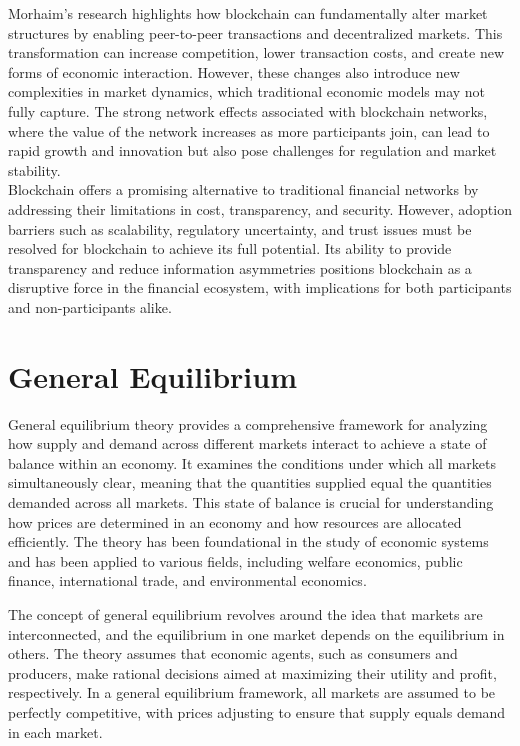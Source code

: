 Morhaim’s research highlights how blockchain can fundamentally alter market structures by enabling peer-to-peer transactions and decentralized markets. This transformation can increase competition, lower transaction costs, and create new forms of economic interaction. However, these changes also introduce new complexities in market dynamics, which traditional economic models may not fully capture. The strong network effects associated with blockchain networks, where the value of the network increases as more participants join, can lead to rapid growth and innovation but also pose challenges for regulation and market stability.
\cite{morhaim_blockchain_2019}\\

Blockchain offers a promising alternative to traditional financial networks by addressing their limitations in cost, transparency, and security. However, adoption barriers such as scalability, regulatory uncertainty, and trust issues must be resolved for blockchain to achieve its full potential. Its ability to provide transparency and reduce information asymmetries positions blockchain as a disruptive force in the financial ecosystem, with implications for both participants and non-participants alike.


\section{General Equilibrium}\label{cTGE}
General equilibrium theory provides a comprehensive framework for analyzing how supply and demand across different markets interact to achieve a state of balance within an economy. It examines the conditions under which all markets simultaneously clear, meaning that the quantities supplied equal the quantities demanded across all markets. This state of balance is crucial for understanding how prices are determined in an economy and how resources are allocated efficiently. The theory has been foundational in the study of economic systems and has been applied to various fields, including welfare economics, public finance, international trade, and environmental economics.

The concept of general equilibrium revolves around the idea that markets are interconnected, and the equilibrium in one market depends on the equilibrium in others. The theory assumes that economic agents, such as consumers and producers, make rational decisions aimed at maximizing their utility and profit, respectively. In a general equilibrium framework, all markets are assumed to be perfectly competitive, with prices adjusting to ensure that supply equals demand in each market.

